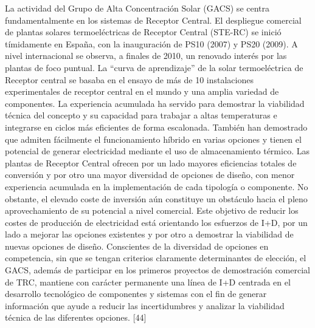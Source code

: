 \documentclass[12pt]{article}
\begin{document}
La actividad del Grupo de Alta Concentración Solar (GACS) se centra fundamentalmente en los sistemas de Receptor Central. El despliegue comercial de plantas solares termoeléctricas de Receptor Central (STE-RC) se inició tímidamente en España, con la inauguración de PS10 (2007) y PS20 (2009). A nivel internacional se observa, a finales de 2010, un renovado interés por las plantas de foco puntual.
La “curva de aprendizaje” de la solar termoeléctrica de Receptor central se basaba en el ensayo de más de 10 instalaciones experimentales de receptor central en el mundo y una amplia variedad de componentes.
La experiencia acumulada ha servido para demostrar la viabilidad técnica del concepto y su capacidad para trabajar a altas temperaturas e integrarse en ciclos más eficientes de forma escalonada. También han demostrado que admiten fácilmente el funcionamiento híbrido en varias opciones y tienen el potencial de generar electricidad mediante el uso de almacenamiento térmico.
Las plantas de Receptor Central ofrecen por un lado mayores eficiencias totales de conversión y por otro una mayor diversidad de opciones de diseño, con menor experiencia acumulada en la implementación de cada tipología o componente. No obstante, el elevado coste de inversión aún constituye un obstáculo hacia el pleno aprovechamiento de su potencial a nivel comercial.
Este objetivo de reducir los costes de producción de electricidad está orientando los esfuerzos de I+D, por un lado a mejorar las opciones existentes y por otro a  demostrar la viabilidad de nuevas opciones de diseño.
Conscientes de la diversidad de opciones en competencia, sin que se tengan criterios claramente determinantes de elección, el GACS, además de participar en los primeros proyectos de demostración comercial de TRC, mantiene con carácter permanente una línea de I+D centrada en el desarrollo tecnológico de componentes y sistemas con el fin de generar información que ayude a reducir las incertidumbres y analizar la viabilidad técnica de las diferentes opciones. [44]
\end{document}
